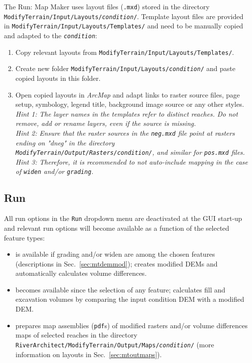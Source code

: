 The Run: Map Maker uses layout files (\texttt{.mxd}) stored in the directory \texttt{ModifyTerrain/Input/Layouts/\textit{condition}/}. Template layout files are provided in \texttt{ModifyTerrain/Input/Layouts/Templates/} and need to be manually copied and adapted to the \texttt{\textit{condition}}:
\begin{enumerate}
	\item Copy relevant layouts from \texttt{ModifyTerrain/Input/Layouts/Templates/}.
	\item Create new folder \texttt{ModifyTerrain/Input/Layouts/\textit{condition}/} and paste copied layouts in this folder.
	\item Open copied layouts in \textit{ArcMap} and adapt links to raster source files, page setup, symbology, legend title, background image source or any other styles.\\
	\textit{Hint 1: The layer names in the templates refer to distinct reaches. Do not remove, add or rename layers, even if the source is missing.}\\
	\textit{Hint 2: Ensure that the raster sources in the \texttt{{\myUnderscore}neg.mxd} file point at rasters ending on "{\myUnderscore}d{\myUnderscore}neg" in the directory \texttt{ModifyTerrain/Output/Rasters/condition/}, and similar for \texttt{{\myUnderscore}pos.mxd} files.}\\
	\textit{Hint 3:  Therefore, it is recommended to not auto-include mapping in the case of \texttt{widen} and/or \texttt{grading}.}
\end{enumerate}

\subsection{Run}\label{sec:mtrun}

All run options in the \texttt{Run} dropdown menu are deactivated at the GUI start-up and relevant run options will become available as a function of the selected feature types:

\begin{itemize}
\item {} is available if grading and/or widen are among the chosen features (descriptions in Sec.~\ref{sec:mtdemmod}); creates modified DEMs and automatically calculates volume differences.
\item {} becomes available since the selection of any feature; calculates fill and excavation volumes by comparing the input condition DEM with a modified DEM.
\item {} prepares map assemblies (\texttt{pdf}s) of modified rasters and/or volume differences maps of selected reaches in the directory \texttt{RiverArchitect/ModifyTerrain/Output/Maps/\textit{condition}/} (more information on layouts in Sec.~\ref{sec:mtoutmaps}).
\end{itemize}



